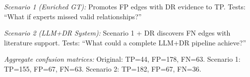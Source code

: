 \begin{table}[H]
\centering
\begin{minipage}{\linewidth}
\centering
\caption{LLM Generation Metrics: Two Enrichment Scenarios (Aggregate and Per-CLD)}
\label{tab:enriched_gt}
\begin{threeparttable}
\begin{tablenotes}
\small
\item \textit{Scenario 1 (Enriched GT):} Promotes FP edges with DR evidence to TP. Tests: ``What if experts missed valid relationships?''
\item \textit{Scenario 2 (LLM+DR System):} Scenario 1 + DR discovers FN edges with literature support. Tests: ``What could a complete LLM+DR pipeline achieve?''
\item \textit{Aggregate confusion matrices:} Original: TP=44, FP=178, FN=63. Scenario 1: TP=155, FP=67, FN=63. Scenario 2: TP=182, FP=67, FN=36.
\end{tablenotes}
\end{threeparttable}
\end{minipage}
\end{table}
